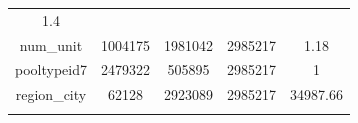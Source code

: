\documentclass[]{book}
\theoremstyle{definition}
\theoremstyle{definition}
\theoremstyle{definition}
\theoremstyle{remark}
\begin{document}
\begin{longtable}[]{@{}ccccc@{}}
\begin{minipage}[t]{0.12\columnwidth}
1.4\strut
\end{minipage}\tabularnewline
\begin{minipage}[t]{0.35\columnwidth}\centering\strut
num\_unit\strut
\end{minipage} & \begin{minipage}[t]{0.12\columnwidth}\centering\strut
1004175\strut
\end{minipage} & \begin{minipage}[t]{0.13\columnwidth}\centering\strut
1981042\strut
\end{minipage} & \begin{minipage}[t]{0.12\columnwidth}\centering\strut
2985217\strut
\end{minipage} & \begin{minipage}[t]{0.12\columnwidth}\centering\strut
1.18\strut
\end{minipage}\tabularnewline
\begin{minipage}[t]{0.35\columnwidth}\centering\strut
pooltypeid7\strut
\end{minipage} & \begin{minipage}[t]{0.12\columnwidth}\centering\strut
2479322\strut
\end{minipage} & \begin{minipage}[t]{0.13\columnwidth}\centering\strut
505895\strut
\end{minipage} & \begin{minipage}[t]{0.12\columnwidth}\centering\strut
2985217\strut
\end{minipage} & \begin{minipage}[t]{0.12\columnwidth}\centering\strut
1\strut
\end{minipage}\tabularnewline
\begin{minipage}[t]{0.35\columnwidth}\centering\strut
region\_city\strut
\end{minipage} & \begin{minipage}[t]{0.12\columnwidth}\centering\strut
62128\strut
\end{minipage} & \begin{minipage}[t]{0.13\columnwidth}\centering\strut
2923089\strut
\end{minipage} & \begin{minipage}[t]{0.12\columnwidth}\centering\strut
2985217\strut
\end{minipage} & \begin{minipage}[t]{0.12\columnwidth}\centering\strut
34987.66\strut
\end{minipage}\tabularnewline
\begin{minipage}[t]{0.35\columnwidth}\centering\strut

\end{minipage}
\end{longtable}
\end{document}
